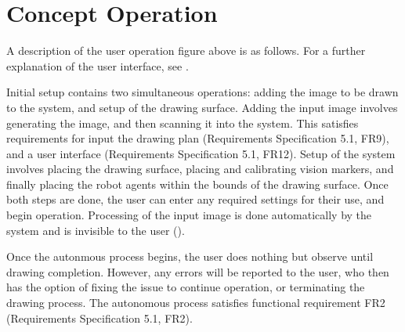 
\section{Concept Operation}
\label{sec:concept_operation}


A description of the user operation figure above is as follows. For a further explanation of the user interface, see .

Initial setup contains two simultaneous operations: adding the image to be drawn to the system, and setup of the drawing surface. Adding the input image involves generating the image, and then scanning it into the system. This satisfies requirements for input the drawing plan (Requirements Specification 5.1, FR9), and a user interface (Requirements Specification 5.1, FR12). Setup of the system involves placing the drawing surface, placing and calibrating vision markers, and finally placing the robot agents within the bounds of the drawing surface. Once both steps are done, the user can enter any required settings for their use, and begin operation. Processing of the input image is done automatically by the system and is invisible to the user ().

Once the autonmous process begins, the user does nothing but observe until drawing completion. However, any errors will be reported to the user, who then has the option of fixing the issue to continue operation, or terminating the drawing process. The autonomous process satisfies functional requirement FR2 (Requirements Specification 5.1, FR2).
